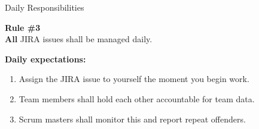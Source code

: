 \documentclass[compress, 10pt]{beamer}
\begin{document}

\begin{frame}{Daily Responsibilities}%
  \begin{mdframed}[style=HavasuLightBlueStyle]%
    \textbf{Rule \#3}\\%
    \textbf{All} JIRA issues shall be managed daily.
  \end{mdframed}%
  \begin{mdframed}[style=HavasuLightGreenStyle]%
    \textbf{Daily expectations:}%
    \begin{enumerate}%
      \item Assign the JIRA issue to yourself the moment you begin work.
      \item Team members shall hold each other accountable for team data.
      \item Scrum masters shall monitor this and report repeat offenders.
    \end{enumerate}%
  \end{mdframed}%
\end{frame}%

\end{document}
